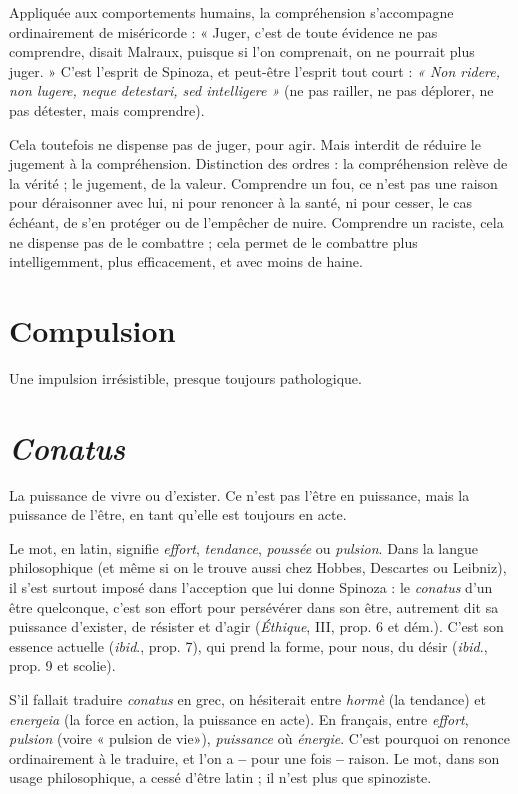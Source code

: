 Appliquée aux comportements humains, la compréhension s'accompagne
ordinairement de miséricorde : « Juger, c’est de toute évidence ne pas comprendre,
disait Malraux, puisque si l'on comprenait, on ne pourrait plus
juger. » C’est l'esprit de Spinoza, et peut-être l'esprit tout court : {\it « Non ridere,
non lugere, neque detestari, sed intelligere »} (ne pas railler, ne pas déplorer, ne pas
détester, mais comprendre).

Cela toutefois ne dispense pas de juger, pour agir. Mais interdit de réduire
le jugement à la compréhension. Distinction des ordres : la compréhension
relève de la vérité ; le jugement, de la valeur. Comprendre un fou, ce n’est pas
une raison pour déraisonner avec lui, ni pour renoncer à la santé, ni pour
cesser, le cas échéant, de s’en protéger ou de l’empêcher de nuire. Comprendre
un raciste, cela ne dispense pas de le combattre ; cela permet de le combattre
plus intelligemment, plus efficacement, et avec moins de haine.

\section{Compulsion}
Une impulsion irrésistible, presque toujours pathologique.

\section{\it Conatus}
La puissance de vivre ou d’exister. Ce n’est pas l’être en puissance,
mais la puissance de l'être, en tant qu’elle est toujours en acte.

Le mot, en latin, signifie {\it effort}, {\it tendance}, {\it poussée} ou {\it pulsion}. Dans la langue
philosophique (et même si on le trouve aussi chez Hobbes, Descartes ou Leibniz),
il s’est surtout imposé dans l’acception que lui donne Spinoza : le {\it conatus}
d’un être quelconque, c’est son effort pour persévérer dans son être, autrement
dit sa puissance d’exister, de résister et d’agir ({\it Éthique}, III, prop. 6 et dém.).
C’est son essence actuelle ({\it ibid}., prop. 7), qui prend la forme, pour nous, du
désir ({\it ibid}., prop. 9 et scolie).

S’il fallait traduire {\it conatus} en grec, on hésiterait entre {\it hormè} (la tendance)
et {\it energeia} (la force en action, la puissance en acte). En français, entre {\it effort},
{\it pulsion} (voire « pulsion de vie»), {\it puissance} où {\it énergie}. C’est pourquoi on
renonce ordinairement à le traduire, et l’on a {\bf --} pour une fois {\bf --} raison. Le mot,
dans son usage philosophique, a cessé d’être latin ; il n’est plus que spinoziste.

